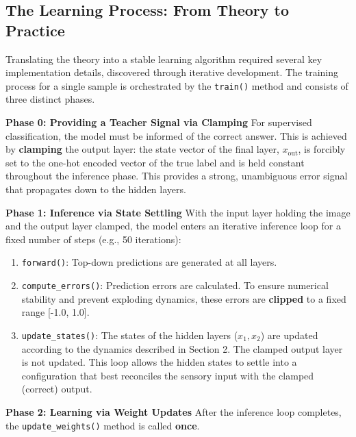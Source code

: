 \documentclass[a4paper,12pt]{article}
\begin{document}
\subsection{The Learning Process: From Theory to Practice}
Translating the theory into a stable learning algorithm required several key implementation details, discovered through iterative development. The training process for a single sample is orchestrated by the \texttt{train()} method and consists of three distinct phases.

\textbf{Phase 0: Providing a Teacher Signal via Clamping}
For supervised classification, the model must be informed of the correct answer. This is achieved by \textbf{clamping} the output layer: the state vector of the final layer, $x_{\text{out}}$, is forcibly set to the one-hot encoded vector of the true label and is held constant throughout the inference phase. This provides a strong, unambiguous error signal that propagates down to the hidden layers.

\textbf{Phase 1: Inference via State Settling}
With the input layer holding the image and the output layer clamped, the model enters an iterative inference loop for a fixed number of steps (e.g., 50 iterations):
\begin{enumerate}
    \item \texttt{forward()}: Top-down predictions are generated at all layers.
    \item \texttt{compute\_errors()}: Prediction errors are calculated. To ensure numerical stability and prevent exploding dynamics, these errors are \textbf{clipped} to a fixed range [-1.0, 1.0].
    \item \texttt{update\_states()}: The states of the hidden layers ($x_1, x_2$) are updated according to the dynamics described in Section 2. The clamped output layer is not updated. This loop allows the hidden states to settle into a configuration that best reconciles the sensory input with the clamped (correct) output.
\end{enumerate}

\textbf{Phase 2: Learning via Weight Updates}
After the inference loop completes, the \texttt{update\_weights()} method is called \textbf{once}.
\end{document}
